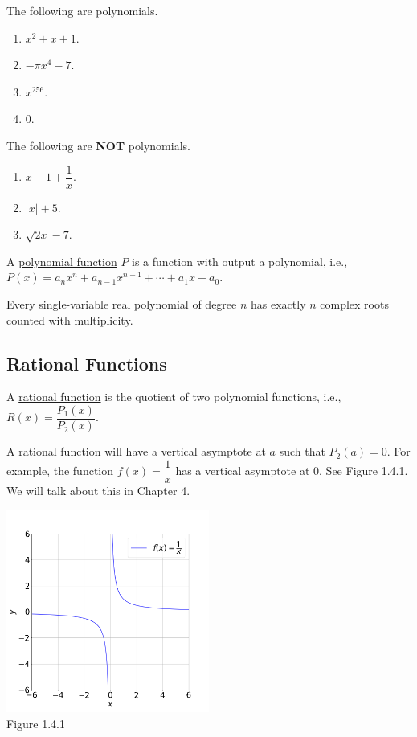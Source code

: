 \documentclass[11pt]{book}
\theoremstyle{break}
\theoremstyle{no_label}
\newcommand{\figtag}[1]{\\[-1.2em]Figure {#1}}
\numberwithin{equation}{section}
\begin{document}
\begin{example}
    The following are polynomials.
    \begin{enumerate}
        \item $x^2+x+1$.
        \item $-\pi x^4-7$.
        \item $x^{256}$.
        \item $0$.
    \end{enumerate}
\end{example}

\begin{example}
    The following are \textbf{NOT} polynomials.
    \begin{enumerate}
        \item $x+1+\dfrac{1}{x}$.
        \item $|x|+5$.
        \item $\sqrt{2x}-7$.
    \end{enumerate}
\end{example}

\begin{definition}
    A \underline{polynomial function} $P$ is a function with output a polynomial, i.e., $P(x)=a_nx^n+a_{n-1}x^{n-1}+\cdots+a_1x+a_0$.
\end{definition}

\begin{theorem}
    Every single-variable real polynomial of degree $n$ has exactly $n$ complex roots counted with multiplicity.
\end{theorem}

\subsection*{Rational Functions}

\begin{definition}
    A \underline{rational function} is the quotient of two polynomial functions, i.e., $R(x)=\dfrac{P_1(x)}{P_2(x)}$.
\end{definition}

A rational function will have a vertical asymptote at $a$ such that $P_2(a)=0$. For example, the function $f(x)=\dfrac{1}{x}$ has a vertical asymptote at $0$. See Figure 1.4.1. We will talk about this in Chapter 4.

\begin{center}
    \includegraphics[width=0.5\textwidth]{reciprocal_of_x.png}\figtag{1.4.1}
\end{center}
\end{document}
